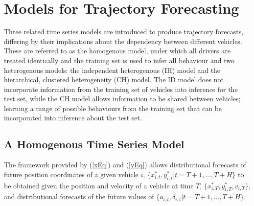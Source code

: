 \documentclass[12pt,a4paper]{article}\usepackage[]{graphicx}\usepackage[]{color}
\begin{document}
\section{Models for Trajectory Forecasting}
\label{sec:models}

Three related time series models are introduced to produce trajectory forecasts, differing by their implications about the dependency between different vehicles. These are referred to as the homogenous model, under which all drivers are treated identically and the training set is used to infer all behaviour and two heterogenous models: the independent heterogenous (IH) model and the hierarchical, clustered heterogeneity (CH) model. The ID model does not incorporate information from the training set of vehicles into inference for the test set, while the CH model allows information to be shared between vehicles; learning a range of possible behaviours from the training set that can be incorporated into inference about the test set. 
\\

\subsection{A Homogenous Time Series Model}
\label{subsec:homogenous}

The framework provided by (\ref{xEq}) and (\ref{yEq}) allows distributional forecasts of future position coordinates of a given vehicle $i$, $\{x^*_{i, t}, y^*_{i, t} | t = T + 1, \dots, T+H\}$ to be obtained given the position and velocity of a vehicle at time $T$, $\{x^*_{i, T}, y^*_{i, T}, v_{i, T}\}$, and distributional forecasts of the future values of $\{a_{i, t}, \delta_{i, t} | t = T + 1, \dots, T+H\}$.  
\\
\end{document}
